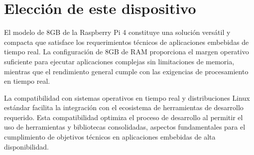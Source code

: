\section{Elección de este dispositivo}

El modelo de 8GB de la Raspberry Pi 4 constituye una solución versátil y compacta que satisface los requerimientos técnicos de aplicaciones embebidas de tiempo real. La configuración de 8GB de RAM proporciona el margen operativo suficiente para ejecutar aplicaciones complejas sin limitaciones de memoria, mientras que el rendimiento general cumple con las exigencias de procesamiento en tiempo real.

La compatibilidad con sistemas operativos en tiempo real y distribuciones Linux estándar facilita la integración con el ecosistema de herramientas de desarrollo requerido. Esta compatibilidad optimiza el proceso de desarrollo al permitir el uso de herramientas y bibliotecas consolidadas, aspectos fundamentales para el cumplimiento de objetivos técnicos en aplicaciones embebidas de alta disponibilidad.